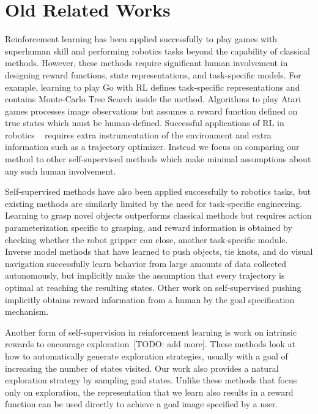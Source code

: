 \section{Old Related Works}
Reinforcement learning has been applied successfully to play games with superhuman skill and performing robotics tasks beyond the capability of classical methods.
However, these methods require significant human involvement in designing reward functions, state representations, and task-specific models.
For example, learning to play Go with RL \cite{silver2016alphago} defines task-specific representations and contains Monte-Carlo Tree Search inside the method.
Algorithms to play Atari games \cite{mnih2015human} processes image observations but assumes a reward function defined on true states which must be human-defined.
Successful applications of RL in robotics ~\cite{levine2017grasping,gu2016naf}
requires extra instrumentation of the environment and extra information such as a trajectory optimizer.
Instead we focus on comparing our method to other self-supervised methods which make minimal assumptions about any such human involvement.

Self-supervised methods have also been applied successfully to robotics tasks, but existing methods are similarly limited by the need for task-specific engineering.
Learning to grasp novel objects \cite{pinto2015supersizing, levine2017grasping} outperforms classical methods but requires action parameterization specific to grasping, and reward information is obtained by checking whether the robot gripper can close, another task-specific module.
Inverse model methods that have learned to push objects, tie knots, and do visual navigation \cite{agrawal2016poking, pathak2018zeroshot} successfully learn behavior from large amounts of data collected autonomously, but implicitly make the assumption that every trajectory is optimal at reaching the resulting states.
Other work on self-supervised pushing  \cite{finn2016visualforesight, ebert2017videoprediction} implicitly obtains reward information from a human by the goal specification mechanism.

Another form of self-supervision in reinforcement learning is work on intrinsic rewards to encourage exploration~\cite{pathak2017curiosity,bellemare2016unifying}[TODO: add more].
These methods look at how to automatically generate exploration strategies, usually with a goal of increasing the number of states visited.
Our work also provides a natural exploration strategy by sampling goal states.
Unlike these methods that focus only on exploration, the representation that we learn also results in a reward function can be used directly to achieve a goal image specified by a user.

